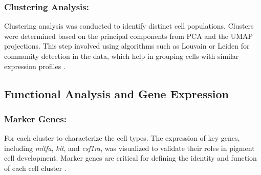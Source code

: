 \documentclass[runningheads]{llncs}
\begin{document}
\subsubsection{Clustering Analysis:} Clustering analysis was conducted to identify distinct cell populations. Clusters were determined based on the principal components from PCA and the UMAP projections. This step involved using algorithms such as Louvain or Leiden for community detection in the data, which help in grouping cells with similar expression profiles \cite{street2018slingshot}.

\subsection*{Functional Analysis and Gene Expression}
\subsubsection{Marker Genes:} For each cluster to characterize the cell types. The expression of key genes, including \textit{mitfa}, \textit{kit}, and \textit{csf1ra}, was visualized to validate their roles in pigment cell development. Marker genes are critical for defining the identity and function of each cell cluster \cite{howard2021atlas}.
\end{document}
